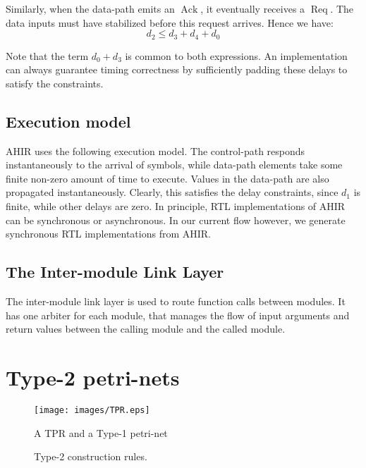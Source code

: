 \documentclass[conference]{IEEEtran}
\newcommand{\sym}[1]{$\operatorname{#1}$}
\begin{document}
Similarly, when the data-path emits an \sym{Ack}, it eventually
receives a \sym{Req}. The data inputs must have stabilized before
this request arrives. Hence we have:
\[d_2 \le d_3 + d_4 + d_0\]

Note that the term $d_0 + d_3$ is common to both expressions. An
implementation can always guarantee timing correctness by sufficiently
padding these delays to satisfy the constraints.

\subsection{Execution model}

AHIR uses the following execution model. The control-path responds
instantaneously to the arrival of symbols, while data-path elements
take some finite non-zero amount of time to execute. Values in the data-path are also
propagated instantaneously. Clearly, this satisfies the delay
constraints, since $d_1$ is finite, while other delays are zero.  
In principle, RTL implementations of AHIR can be synchronous or asynchronous.  In 
our current flow however, we generate synchronous RTL implementations from
AHIR.

\subsection{The Inter-module Link Layer}

The inter-module link layer is used to route function calls between
modules. It has one arbiter for each module, that manages the flow of
input arguments and return values between the calling module and the
called module. 

\section{Type-2 petri-nets}
\label{section:type-2}

\begin{figure}[!t]
  \centering
  \texttt{[image: images/TPR.eps]}
  \caption{A TPR and a Type-1 petri-net}
  \label{figure:TPR}
\end{figure}

\begin{figure}[!t]
  \centering
  \hspace{0.125in}
  \caption{Type-2 construction rules.}
  \label{figure:Type-2-TPRs}
\end{figure}
\end{document}
